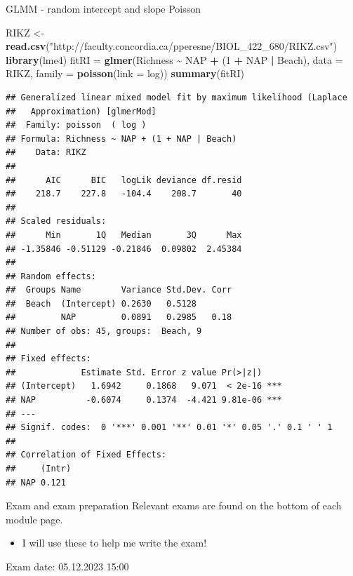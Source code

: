 \documentclass[
  ignorenonframetext,
]{beamer}
\newenvironment{Shaded}{\begin{snugshade}}{\end{snugshade}}
\newcommand{\AttributeTok}[1]{\textcolor[rgb]{0.13,0.29,0.53}{#1}}
\newcommand{\DecValTok}[1]{\textcolor[rgb]{0.00,0.00,0.81}{#1}}
\newcommand{\FunctionTok}[1]{\textcolor[rgb]{0.13,0.29,0.53}{\textbf{#1}}}
\newcommand{\NormalTok}[1]{#1}
\newcommand{\OtherTok}[1]{\textcolor[rgb]{0.56,0.35,0.01}{#1}}
\newcommand{\SpecialCharTok}[1]{\textcolor[rgb]{0.81,0.36,0.00}{\textbf{#1}}}
\newcommand{\StringTok}[1]{\textcolor[rgb]{0.31,0.60,0.02}{#1}}
\providecommand{\tightlist}{%
  \setlength{\itemsep}{0pt}\setlength{\parskip}{0pt}}
\begin{document}
\begin{frame}[fragile]
\begin{block}{GLMM - random intercept and slope Poisson}
\protect\hypertarget{glmm---random-intercept-and-slope-poisson}{}
\begin{Shaded}
\begin{Highlighting}[]
\NormalTok{RIKZ }\OtherTok{\textless{}{-}} \FunctionTok{read.csv}\NormalTok{(}\StringTok{"http://faculty.concordia.ca/pperesne/BIOL\_422\_680/RIKZ.csv"}\NormalTok{)}
\FunctionTok{library}\NormalTok{(lme4)}
\NormalTok{fitRI }\OtherTok{=} \FunctionTok{glmer}\NormalTok{(Richness }\SpecialCharTok{\textasciitilde{}}\NormalTok{ NAP }\SpecialCharTok{+}\NormalTok{ (}\DecValTok{1} \SpecialCharTok{+}\NormalTok{ NAP }\SpecialCharTok{|}\NormalTok{ Beach), }\AttributeTok{data =}\NormalTok{ RIKZ, }\AttributeTok{family =} \FunctionTok{poisson}\NormalTok{(}\AttributeTok{link =}\NormalTok{ log))}
\FunctionTok{summary}\NormalTok{(fitRI)}
\end{Highlighting}
\end{Shaded}

\begin{verbatim}
## Generalized linear mixed model fit by maximum likelihood (Laplace
##   Approximation) [glmerMod]
##  Family: poisson  ( log )
## Formula: Richness ~ NAP + (1 + NAP | Beach)
##    Data: RIKZ
## 
##      AIC      BIC   logLik deviance df.resid 
##    218.7    227.8   -104.4    208.7       40 
## 
## Scaled residuals: 
##      Min       1Q   Median       3Q      Max 
## -1.35846 -0.51129 -0.21846  0.09802  2.45384 
## 
## Random effects:
##  Groups Name        Variance Std.Dev. Corr
##  Beach  (Intercept) 0.2630   0.5128       
##         NAP         0.0891   0.2985   0.18
## Number of obs: 45, groups:  Beach, 9
## 
## Fixed effects:
##             Estimate Std. Error z value Pr(>|z|)    
## (Intercept)   1.6942     0.1868   9.071  < 2e-16 ***
## NAP          -0.6074     0.1374  -4.421 9.81e-06 ***
## ---
## Signif. codes:  0 '***' 0.001 '**' 0.01 '*' 0.05 '.' 0.1 ' ' 1
## 
## Correlation of Fixed Effects:
##     (Intr)
## NAP 0.121
\end{verbatim}
\end{block}
\end{frame}

\begin{frame}{Exam and exam preparation}
\protect\hypertarget{exam-and-exam-preparation}{}
Relevant exams are found on the bottom of each module page.

\begin{itemize}
\tightlist
\item
  I will use these to help me write the exam!
\end{itemize}

Exam date: 05.12.2023 15:00
\end{frame}
\end{document}
